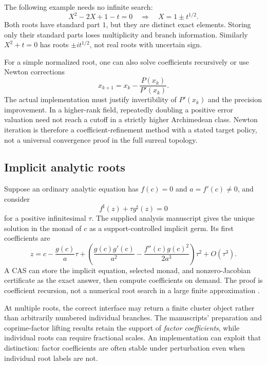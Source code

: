 \documentclass[11pt,letterpaper]{article}
\theoremstyle{definition}
\newcommand{\sh}{^{\sharp}}
\numberwithin{equation}{section}
\begin{document}
The following example needs no infinite search:
\[
 X^2-2X+1-t=0
 \quad\Longrightarrow\quad X=1\pm t^{1/2}.
\]
Both roots have standard part $1$, but they are distinct exact elements. Storing only their standard parts loses multiplicity and branch information. Similarly $X^2+t=0$ has roots $\pm i t^{1/2}$, not real roots with uncertain sign.

For a simple normalized root, one can also solve coefficients recursively or use Newton corrections
\[
 x_{k+1}=x_k-\frac{P(x_k)}{P'(x_k)}.
\]
The actual implementation must justify invertibility of $P'(x_k)$ and the precision improvement. In a higher-rank field, repeatedly doubling a positive error valuation need not reach a cutoff in a strictly higher Archimedean class. Newton iteration is therefore a coefficient-refinement method with a stated target policy, not a universal convergence proof in the full surreal topology.

\subsection{Implicit analytic roots}
Suppose an ordinary analytic equation has $f(c)=0$ and $a=f'(c)\ne0$, and consider
\[
 f\sh(z)+\tau g\sh(z)=0
\]
for a positive infinitesimal $\tau$. The supplied analysis manuscript gives the unique solution in the monad of $c$ as a support-controlled implicit germ. Its first coefficients are
\begin{equation}\label{eq:implicit}
 z=c-\frac{g(c)}a\tau+
 \left(\frac{g(c)g'(c)}{a^2}
       -\frac{f''(c)g(c)^2}{2a^3}\right)\tau^2+O(\tau^3).
\end{equation}
A CAS can store the implicit equation, selected monad, and nonzero-Jacobian certificate as the exact answer, then compute coefficients on demand. The proof is coefficient recursion, not a numerical root search in a large finite approximation \cite[``Computing a lifted simple root'']{SourceAnalysis}.

At multiple roots, the correct interface may return a finite cluster object rather than arbitrarily numbered individual branches. The manuscripts' preparation and coprime-factor lifting results retain the support of \emph{factor coefficients}, while individual roots can require fractional scales. An implementation can exploit that distinction: factor coefficients are often stable under perturbation even when individual root labels are not.
\end{document}
